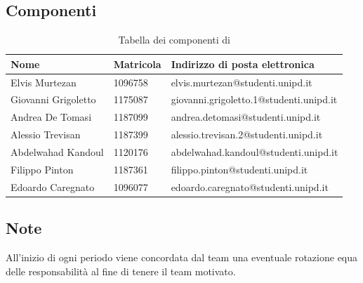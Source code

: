 \subsection{Componenti}
{
    \renewcommand{\arraystretch}{2}
	\begin{longtable}{ C{4cm} C{2cm} C{7.4cm} }
		\caption{Tabella dei componenti di \Gruppo{}}\\
		\rowcolor{\primaryColor}
        \textcolor{\secondaryColor}{\textbf{Nome}} & \textcolor{\secondaryColor}{\textbf{Matricola}} & \textcolor{\secondaryColor}{\textbf{Indirizzo di posta elettronica}}\\\endhead	
        {Elvis Murtezan} & 1096758 & {elvis.murtezan@studenti.unipd.it}\\   
        {Giovanni Grigoletto} & 1175087 & {giovanni.grigoletto.1@studenti.unipd.it}\\    
        {Andrea De Tomasi} & 1187099 & {andrea.detomasi@studenti.unipd.it}\\    
        {Alessio Trevisan} & 1187399 & {alessio.trevisan.2@studenti.unipd.it}\\    
        {Abdelwahad Kandoul} & 1120176 & {abdelwahad.kandoul@studenti.unipd.it} \\    
        {Filippo Pinton} & 1187361 & {filippo.pinton@studenti.unipd.it}\\    
        {Edoardo Caregnato} & 1096077 & {edoardo.caregnato@studenti.unipd.it}\\       
	\end{longtable}
}
\subsection{Note}
All'inizio di ogni periodo viene concordata dal team una eventuale rotazione equa delle responsabilità al fine di tenere il team motivato.